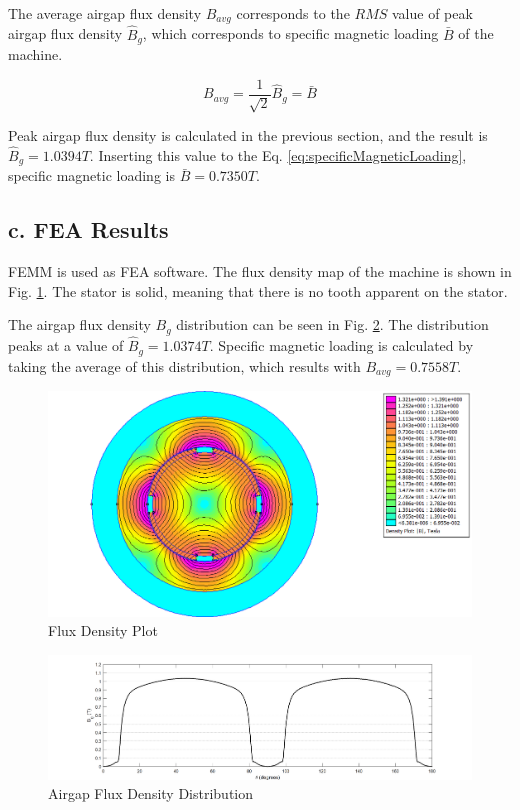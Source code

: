 \documentclass[a4paper, 11pt, titlepage]{article}
\begin{document}
The average airgap flux density $B_{avg}$ corresponds to the $RMS$ value of peak airgap flux density $\hat{B}_g$, which corresponds to specific magnetic loading $\bar{B}$ of the machine.

\begin{equation}
	B_{avg} = \frac{1}{\sqrt{2}}\hat{B}_g = \bar{B}
	\label{eq:specificMagneticLoading}
\end{equation}

Peak airgap flux density is calculated in the previous section, and the result is $\hat{B}_g=1.0394T$. Inserting this value to the Eq. \ref{eq:specificMagneticLoading}, specific magnetic loading is $\bar{B}=0.7350T$.


\subsection{c. FEA Results}

FEMM is used as FEA software. The flux density map of the machine is shown in Fig. \ref{fig:Bmap}. The stator is solid, meaning that there is no tooth apparent on the stator.

The airgap flux density $B_g$ distribution can be seen in Fig. \ref{fig:airgapBplot}. The distribution peaks at a value of $\hat{B}_g = 1.0374T$. Specific magnetic loading is calculated by taking the average of this distribution, which results with $B_{avg}=0.7558T$.

\begin{figure}[h]
	\includegraphics[width=\textwidth]{fluxDensity.png}
	\caption{Flux Density Plot}
	\label{fig:Bmap}
\end{figure}

\begin{figure}[h]
	\includegraphics[width=\textwidth]{airgapFluxDensity.png}
	\caption{Airgap Flux Density Distribution}
	\label{fig:airgapBplot}
\end{figure}
\end{document}
